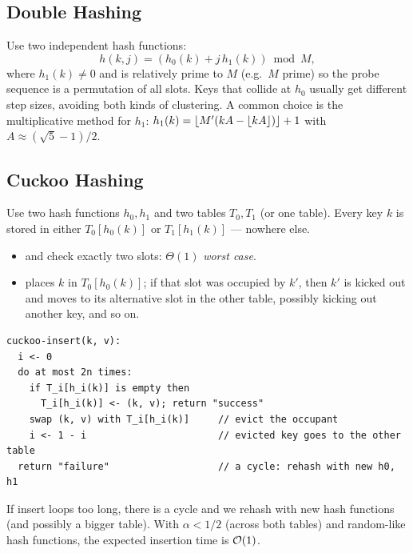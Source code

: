 \subsection{Double Hashing}

Use two independent hash functions:
\[
h(k, j) = (h_0(k) + j\, h_1(k)) \bmod M,
\]
where $h_1(k) \neq 0$ and is relatively prime to $M$ (e.g.\ $M$ prime) so the
probe sequence is a permutation of all slots. Keys that collide at $h_0$ usually
get different step sizes, avoiding both kinds of clustering. A common choice is
the multiplicative method for $h_1$: $h_1(k) = \left\lfloor M' (kA - \left\lfloor kA \right\rfloor) \right\rfloor + 1$
with $A \approx (\sqrt5-1)/2$.

\subsection{Cuckoo Hashing}

Use two hash functions $h_0, h_1$ and two tables $T_0, T_1$ (or one table).
Every key $k$ is stored in either $T_0[h_0(k)]$ or $T_1[h_1(k)]$ --- nowhere else.
\begin{itemize}
  \item {} and  check exactly two slots: $\Theta(1)$
        \emph{worst case}.
  \item {} places $k$ in $T_0[h_0(k)]$; if that slot was occupied by
        $k'$, then $k'$ is kicked out and moves to its alternative slot in the
        other table, possibly kicking out another key, and so on.
\end{itemize}
\begin{lstlisting}
cuckoo-insert(k, v):
  i <- 0
  do at most 2n times:
    if T_i[h_i(k)] is empty then
      T_i[h_i(k)] <- (k, v); return "success"
    swap (k, v) with T_i[h_i(k)]     // evict the occupant
    i <- 1 - i                       // evicted key goes to the other table
  return "failure"                   // a cycle: rehash with new h0, h1
\end{lstlisting}
If insert loops too long, there is a cycle and we rehash with new hash functions
(and possibly a bigger table). With $\alpha < 1/2$ (across both tables) and
random-like hash functions, the expected insertion time is $\mathcal{O}(1)$.

